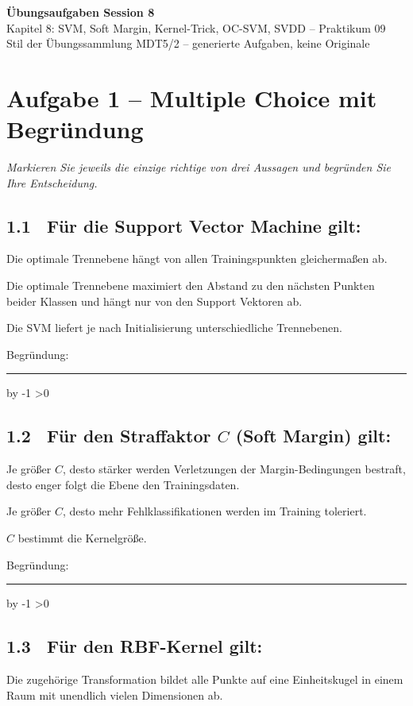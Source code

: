 \documentclass[10pt,a4paper]{article}
\newcommand{\mcbox}{\raisebox{-1pt}{\fbox{\rule{0pt}{7pt}\rule{7pt}{0pt}}}\hspace{6pt}}
\newcommand{\antwortlinien}[1]{%
  \par\vspace{2pt}%
  \newcount\zeilen \zeilen=#1
  \loop
    \noindent\rule{\linewidth}{0.4pt}\par\vspace{11pt}%
    \advance\zeilen by -1
  \ifnum\zeilen>0 \repeat
}
\begin{document}
\begin{center}
  {\Large\bfseries Übungsaufgaben Session 8}\\[4pt]
  {\large Kapitel 8: SVM, Soft Margin, Kernel-Trick, OC-SVM, SVDD -- Praktikum 09}\\[4pt]
  \small Stil der Übungssammlung MDT5/2 -- generierte Aufgaben, keine Originale
\end{center}

\vspace{4pt}

\section*{Aufgabe 1 -- Multiple Choice mit Begründung}
\emph{Markieren Sie jeweils die einzige richtige von drei Aussagen und begründen Sie Ihre Entscheidung.}

\subsection*{1.1 \ Für die Support Vector Machine gilt:}
\mcbox Die optimale Trennebene hängt von allen Trainingspunkten gleichermaßen ab.

\mcbox Die optimale Trennebene maximiert den Abstand zu den nächsten Punkten beider
Klassen und hängt nur von den Support Vektoren ab.

\mcbox Die SVM liefert je nach Initialisierung unterschiedliche Trennebenen.

Begründung:
\antwortlinien{2}

\subsection*{1.2 \ Für den Straffaktor $C$ (Soft Margin) gilt:}
\mcbox Je größer $C$, desto stärker werden Verletzungen der Margin-Bedingungen bestraft,
desto enger folgt die Ebene den Trainingsdaten.

\mcbox Je größer $C$, desto mehr Fehlklassifikationen werden im Training toleriert.

\mcbox $C$ bestimmt die Kernelgröße.

Begründung:
\antwortlinien{2}

\subsection*{1.3 \ Für den RBF-Kernel gilt:}
\mcbox Die zugehörige Transformation bildet alle Punkte auf eine Einheitskugel in einem
Raum mit unendlich vielen Dimensionen ab.
\end{document}
